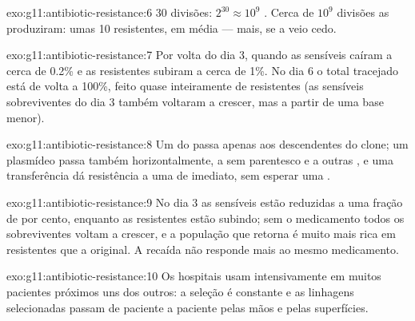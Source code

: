 \begin{solution}{exo:g11:antibiotic-resistance:6}
30 divisões: $2^{30} \approx 10^9$ . Cerca de $10^9$ divisões as
produziram: umas 10  resistentes, em média --- mais, se a
 veio cedo.
\end{solution}

\begin{solution}{exo:g11:antibiotic-resistance:7}
Por volta do dia 3, quando as  sensíveis caíram a cerca de 0.2\%
e as resistentes subiram a cerca de 1\%. No dia 6 o total tracejado
está de volta a 100\%, feito quase inteiramente de  resistentes
(as sensíveis sobreviventes do dia 3 também voltaram a crescer, mas a
partir de uma base menor).
\end{solution}

\begin{solution}{exo:g11:antibiotic-resistance:8}
Um  do  passa apenas aos descendentes do clone; um
plasmídeo passa também horizontalmente, a  sem parentesco e a
outras , e uma transferência dá resistência a uma  de
imediato, sem esperar uma .
\end{solution}

\begin{solution}{exo:g11:antibiotic-resistance:9}
No dia 3 as  sensíveis estão reduzidas a uma fração de por
cento, enquanto as resistentes estão subindo; sem o medicamento todos
os sobreviventes voltam a crescer, e a população que retorna é muito
mais rica em  resistentes que a original. A recaída não responde
mais ao mesmo medicamento.
\end{solution}

\begin{solution}{exo:g11:antibiotic-resistance:10}
Os hospitais usam  intensivamente em muitos pacientes
próximos uns dos outros: a seleção é constante e as linhagens
selecionadas passam de paciente a paciente pelas mãos e pelas
superfícies.
\end{solution}

